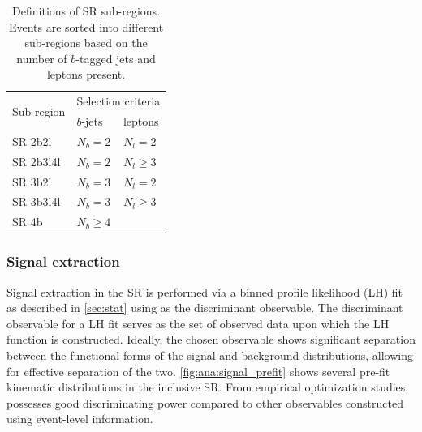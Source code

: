 \documentclass[../thesis.tex]{subfiles}
\begin{document}
\begin{table}[!ht]
\centering
\setlength{\tabcolsep}{12pt} %
\caption{\label{tab:ana:SR}Definitions of \acs{SR} sub-regions. Events are sorted into different sub-regions based on the number of $b$-tagged jets and leptons present.}%
\begin{tabular}{p{2cm}|p{3cm}l}
\toprule\toprule
\multicolumn{1}{c|}{\multirow{ 2}{*}{Sub-region}} & \multicolumn{2}{c}{Selection criteria} \\
\multicolumn{1}{c|}{}	& $b$-jets	& leptons \\
\midrule
SR 2b2l			& $N_b = 2$	& $N_l = 2$ \\
SR 2b3l4l		& $N_b = 2$	& $N_l \geq 3$ \\
SR 3b2l			& $N_b = 3$	& $N_l = 2$ \\
SR 3b3l4l		& $N_b = 3$	& $N_l \geq 3$ \\
SR 4b			& $N_b \geq 4$	& \\
\bottomrule\bottomrule
\end{tabular}
\end{table}

\subsubsection*{Signal extraction}
Signal extraction in the \acs{SR} is performed via a binned profile likelihood (\acs{LH}) fit as described in \autoref{sec:stat} using \HT as the discriminant observable. The discriminant observable for a \acs{LH} fit serves as the set of observed data upon which the \acs{LH} function is constructed. Ideally, the chosen observable shows significant separation between the functional forms of the signal and background distributions, allowing for effective separation of the two. \autoref{fig:ana:signal_prefit} shows several pre-fit kinematic distributions in the inclusive \acs{SR}. From empirical optimization studies, \HT possesses good discriminating power compared to other observables constructed using event-level information.
\end{document}
